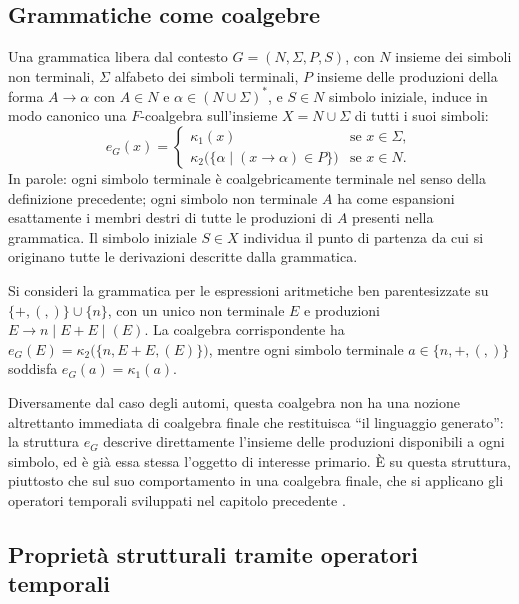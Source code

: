 \subsection{Grammatiche come coalgebre}

Una grammatica libera dal contesto \(G = (N, \Sigma, P, S)\), con \(N\) insieme dei simboli non terminali, \(\Sigma\) alfabeto dei simboli terminali, \(P\) insieme delle produzioni della forma \(A \to \alpha\) con \(A \in N\) e \(\alpha \in (N \cup \Sigma)^*\), e \(S \in N\) simbolo iniziale, induce in modo canonico una \(F\)-coalgebra sull'insieme \(X = N \cup \Sigma\) di tutti i suoi simboli:
\[
  e_G(x) = \begin{cases}
    \kappa_1(x)                                              & \text{se } x \in \Sigma, \\
    \kappa_2\bigl(\{\alpha \mid (x \to \alpha) \in P\}\bigr) & \text{se } x \in N.
  \end{cases}
\]
In parole: ogni simbolo terminale è coalgebricamente terminale nel senso della definizione precedente; ogni simbolo non terminale \(A\) ha come espansioni esattamente i membri destri di tutte le produzioni di \(A\) presenti nella grammatica. Il simbolo iniziale \(S \in X\) individua il punto di partenza da cui si originano tutte le derivazioni descritte dalla grammatica.

\begin{example}
  Si consideri la grammatica per le espressioni aritmetiche ben parentesizzate su \(\{+, (, )\} \cup \{n\}\), con un unico non terminale \(E\) e produzioni \(E \to n \mid E + E \mid (E)\). La coalgebra corrispondente ha \(e_G(E) = \kappa_2\bigl(\{n, E+E, (E)\}\bigr)\), mentre ogni simbolo terminale \(a \in \{n, +, (, )\}\) soddisfa \(e_G(a) = \kappa_1(a)\).
\end{example}

Diversamente dal caso degli automi, questa coalgebra non ha una nozione altrettanto immediata di coalgebra finale che restituisca ``il linguaggio generato'': la struttura \(e_G\) descrive direttamente l'insieme delle produzioni disponibili a ogni simbolo, ed è già essa stessa l'oggetto di interesse primario. È su questa struttura, piuttosto che sul suo comportamento in una coalgebra finale, che si applicano gli operatori temporali sviluppati nel capitolo precedente \cite{jacobs2017}.

\subsection{Proprietà strutturali tramite operatori temporali}

